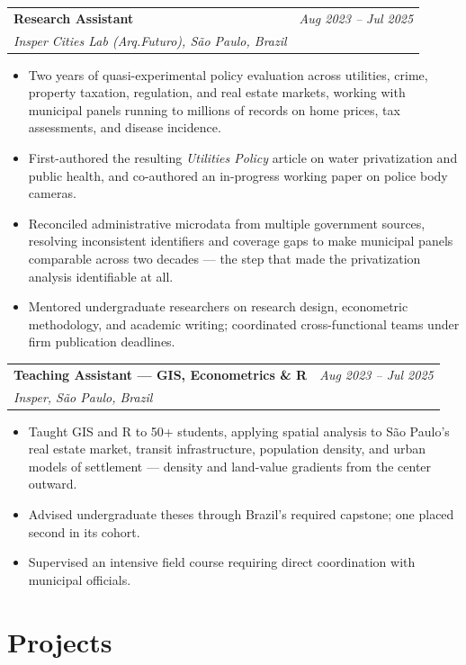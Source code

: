 \documentclass[10pt, letterpaper]{article}
\makeatletter
\newcommand{\cventry}[4]{%
  \noindent
  \begin{tabularx}{\linewidth}{@{}X r@{}}
    \textbf{#1} & \textit{\small #4} \\[0pt]
    \textit{\small #2, #3} & \\
  \end{tabularx}%
  \vspace{0pt}%
}
\makeatother
\begin{document}
\vspace{3pt}

\cventry{Research Assistant}{Insper Cities Lab (Arq.Futuro)}{São Paulo, Brazil}{Aug 2023 – Jul 2025}
\begin{itemize}
  \item Two years of quasi-experimental policy evaluation across utilities, crime, property taxation, regulation, and real estate markets, working with municipal panels running to millions of records on home prices, tax assessments, and disease incidence.
  \item First-authored the resulting \textit{Utilities Policy} article on water privatization and public health, and co-authored an in-progress working paper on police body cameras.
  \item Reconciled administrative microdata from multiple government sources, resolving inconsistent identifiers and coverage gaps to make municipal panels comparable across two decades — the step that made the privatization analysis identifiable at all.
  \item Mentored undergraduate researchers on research design, econometric methodology, and academic writing; coordinated cross-functional teams under firm publication deadlines.
\end{itemize}

\vspace{3pt}

\cventry{Teaching Assistant — GIS, Econometrics \& R}{Insper}{São Paulo, Brazil}{Aug 2023 – Jul 2025}
\begin{itemize}
  \item Taught GIS and R to 50+ students, applying spatial analysis to São Paulo's real estate market, transit infrastructure, population density, and urban models of settlement — density and land-value gradients from the center outward.
  \item Advised undergraduate theses through Brazil's required capstone; one placed second in its cohort.
  \item Supervised an intensive field course requiring direct coordination with municipal officials.
\end{itemize}

\section{Projects}
\end{document}
